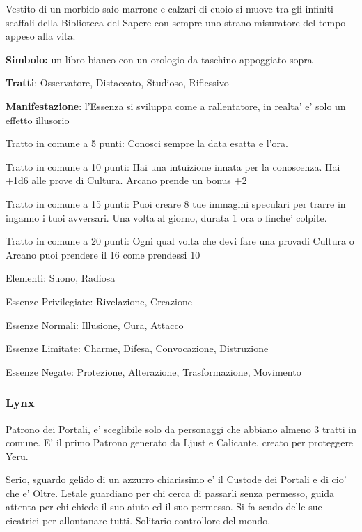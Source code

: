 \documentclass[a4paper,11pt,twoside,openany]{book}
\begin{document}
{Vestito di un morbido saio marrone e calzari di cuoio si muove tra gli infiniti scaffali della Biblioteca del Sapere con sempre uno strano misuratore del tempo appeso alla vita.

\textbf{Simbolo:} un libro bianco con un orologio da taschino appoggiato
sopra

\textbf{Tratti}: Osservatore, Distaccato, Studioso, Riflessivo

\textbf{Manifestazione}: l'Essenza si sviluppa come a rallentatore, in realta' e' solo un effetto illusorio

\bigskip

Tratto in comune a 5 punti: Conosci sempre la data esatta e l'ora.

Tratto in comune a 10 punti: Hai una intuizione innata per la conoscenza. Hai +1d6 alle prove di Cultura. Arcano prende un bonus +2

Tratto in comune a 15 punti: Puoi creare 8 tue immagini speculari per trarre in inganno i tuoi avversari. Una volta al giorno, durata 1 ora o finche' colpite.

Tratto in comune a 20 punti: Ogni qual volta che devi fare una provadi Cultura o Arcano puoi prendere il 16 come prendessi 10

\bigskip

Elementi: Suono, Radiosa

\bigskip

Essenze Privilegiate: Rivelazione, Creazione

Essenze Normali: Illusione, Cura, Attacco

Essenze Limitate: Charme, Difesa, Convocazione, Distruzione

Essenze Negate: Protezione, Alterazione, Trasformazione, Movimento

\subsubsection{Lynx}

\label{lynx}

Patrono dei Portali, e' sceglibile solo da personaggi che abbiano almeno 3 tratti in comune. E' il primo Patrono generato da Ljust e Calicante, creato per proteggere Yeru.

Serio, sguardo gelido di un azzurro chiarissimo e' il Custode dei Portali e di cio' che e' Oltre. Letale guardiano per chi cerca di passarli senza permesso, guida attenta per chi chiede il suo aiuto ed il suo permesso. Si fa scudo delle sue cicatrici per allontanare tutti. 
Solitario controllore del mondo.

}
\end{document}
